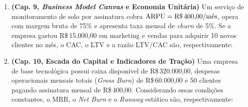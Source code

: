 \begin{enumerate}[leftmargin=1.5em, itemsep=8pt]
  \item \textbf{(Cap. 9, \textit{Business Model Canvas} e Economia Unitária)} Um serviço de monitoramento de solo por assinatura cobra $\text{ARPU} = \text{R\$\,400,00/mês}$, opera com margem bruta de 75\% e apresenta taxa mensal de \textit{churn} de 5\%. Se a empresa gastou R\$\,15.000,00 em marketing e vendas para adquirir 10 novos clientes no mês, o CAC, o LTV e a razão LTV/CAC são, respectivamente:
  \espacoResolucao[1.5cm]

  \item \textbf{(Cap. 10, Escada do Capital e Indicadores de Tração)} Uma empresa de base tecnológica possui caixa disponível de R\$\,320.000,00, despesas operacionais mensais totais (\textit{Gross Burn}) de R\$\,60.000,00 e 50 clientes pagando assinatura mensal de R\$\,400,00. Considerando essas condições constantes, o MRR, o \textit{Net Burn} e o \textit{Runway} estático são, respectivamente:
  \espacoResolucao[1.5cm]


\end{enumerate}
